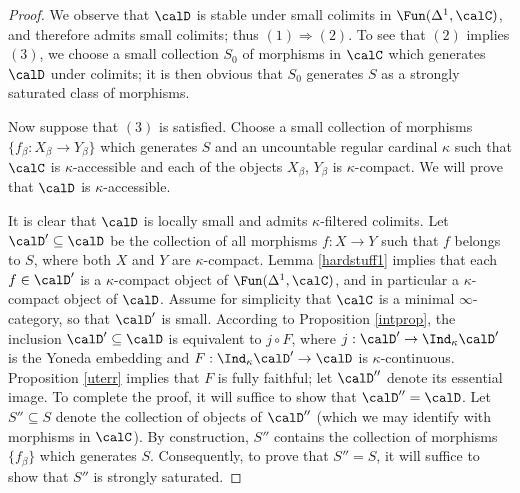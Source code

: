 \begin{proof}
We observe that $\calD$ is stable under small colimits in $\Fun(\Delta^1,\calC)$, and therefore admits small colimits; thus $(1) \Rightarrow (2)$. To see that $(2)$ implies $(3)$, we choose a small collection $S_0$ of morphisms in $\calC$ which generates $\calD$ under colimits; it is then obvious that $S_0$ generates $S$ as a strongly saturated class of morphisms. 

Now suppose that $(3)$ is satisfied. 
Choose a small collection of morphisms $\{ f_{\beta} : X_{\beta} \rightarrow Y_{\beta} \}$ which generates $S$ and an uncountable regular cardinal $\kappa$ such that $\calC$ is $\kappa$-accessible and each of the objects $X_{\beta}$, $Y_{\beta}$ is $\kappa$-compact. We will prove that $\calD$ is $\kappa$-accessible.

It is clear that $\calD$ is locally small and admits $\kappa$-filtered colimits. Let $\calD' \subseteq \calD$ be the collection of all morphisms $f: X \rightarrow Y$ such that $f$ belongs to $S$, where both $X$ and $Y$ are $\kappa$-compact. Lemma \ref{hardstuff1} implies that each $f \in \calD'$ is a $\kappa$-compact object of $\Fun(\Delta^1,\calC)$, and in particular a $\kappa$-compact object of $\calD$.
Assume for simplicity that $\calC$ is a minimal $\infty$-category, so that $\calD'$ is small. According to Proposition \ref{intprop}, the inclusion $\calD' \subseteq \calD$ is equivalent to
$j \circ F$, where $j: \calD' \rightarrow \Ind_{\kappa} \calD'$ is the Yoneda embedding and
$F: \Ind_{\kappa} \calD' \rightarrow \calD$ is $\kappa$-continuous. Proposition \ref{uterr} implies that $F$ is fully faithful; let $\calD''$ denote its essential image. To complete the proof, it will suffice to show that $\calD'' = \calD$. Let $S'' \subseteq S$ denote the collection of objects of $\calD''$ (which we may identify with morphisms in $\calC$). By construction, $S''$ contains the collection of
morphisms $\{ f_{\beta} \}$ which generates $S$. Consequently, to prove that $S'' = S$, it will suffice to show that $S''$ is strongly saturated.


\end{proof}
